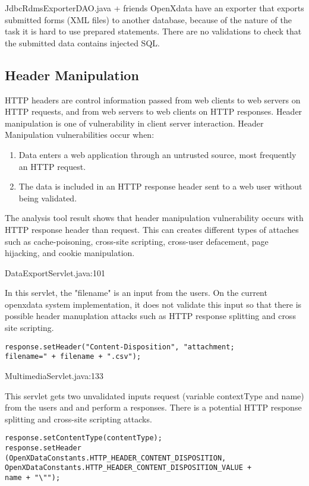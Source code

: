\documentclass[11pt,a4paper]{article}
\theoremstyle{definition}
\begin{document}
JdbcRdmsExporterDAO.java + friends
OpenXdata have an exporter that exports submitted forms (XML files) to another database, because of the nature of the task it is hard to use prepared statements.
There are no validations to check that the submitted data contains injected SQL.

\subsection{Header Manipulation}
HTTP headers are control information passed from web clients to web servers on HTTP requests, and from web servers to web clients on HTTP responses. Header manipulation is one of vulnerability in client server interaction. 
Header Manipulation vulnerabilities occur when:
\begin{enumerate}
 \item Data enters a web application through an untrusted source, most frequently an HTTP request.
 \item The data is included in an HTTP response header sent to a web user without being validated.
\end{enumerate}

The analysis tool result shows that header manipulation vulnerability occurs with HTTP response header than request. This can creates different types of attaches such as cache-poisoning, cross-site scripting, cross-user defacement, page hijacking, and cookie manipulation.

DataExportServlet.java:101

In this servlet, the "filename" is an input from the users. On the current openxdata system implementation, it does not validate this input so that there is possible header manuplation attacks such as HTTP response splitting and cross site scripting.

\begin{lstlisting}
response.setHeader("Content-Disposition", "attachment; 
filename=" + filename + ".csv");
\end{lstlisting} 

MultimediaServlet.java:133

This servlet gets two unvalidated inputs request (variable contextType and name) from the users and and perform a responses. There is a potential HTTP response splitting and cross-site scripting attacks.
 
\begin{lstlisting}
response.setContentType(contentType);
response.setHeader
(OpenXDataConstants.HTTP_HEADER_CONTENT_DISPOSITION,
OpenXDataConstants.HTTP_HEADER_CONTENT_DISPOSITION_VALUE + 
name + "\"");
\end{lstlisting} 
\end{document}
